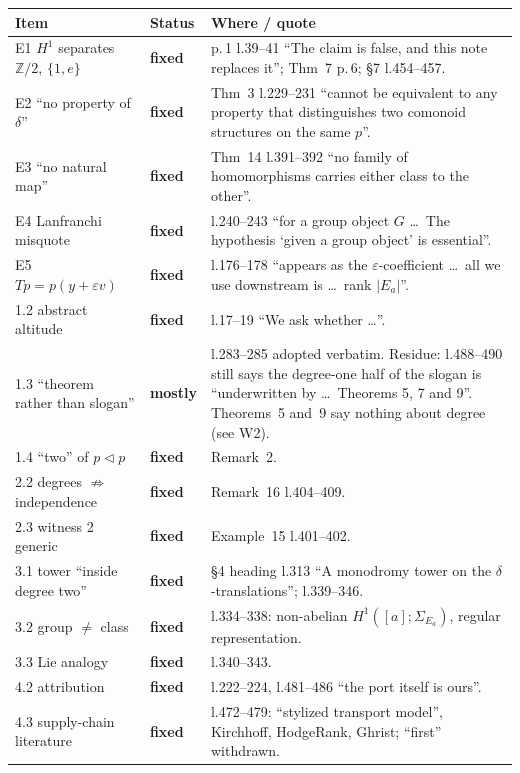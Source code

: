 \documentclass[11pt]{article}
\newcommand{\Z}{\mathbb{Z}}
\begin{document}
\begin{longtable}{p{2.6cm}p{1.9cm}p{10.6cm}}
\toprule
Item & Status & Where / quote\\\midrule\endhead
E1 $H^1$ separates $\Z/2$, $\{1,e\}$ & \textbf{fixed} & p.\,1 l.39--41 ``The claim is false, and this note replaces it''; Thm~7 p.\,6; \S7 l.454--457.\\
E2 ``no property of $\delta$'' & \textbf{fixed} & Thm~3 l.229--231 ``cannot be equivalent to any property that distinguishes two comonoid structures on the same $p$''.\\
E3 ``no natural map'' & \textbf{fixed} & Thm~14 l.391--392 ``no family of homomorphisms carries either class to the other''.\\
E4 Lanfranchi misquote & \textbf{fixed} & l.240--243 ``for a group object $G$ \dots\ The hypothesis `given a group object' is essential''.\\
E5 $Tp=p(y+\varepsilon v)$ & \textbf{fixed} & l.176--178 ``appears as the $\varepsilon$-coefficient \dots\ all we use downstream is \dots\ rank $|E_a|$''.\\
1.2 abstract altitude & \textbf{fixed} & l.17--19 ``We ask whether \dots''.\\
1.3 ``theorem rather than slogan'' & \textbf{mostly} & l.283--285 adopted verbatim. Residue: l.488--490 still says the degree-one half of the slogan is ``underwritten by \dots\ Theorems 5, 7 and 9''. Theorems~5 and~9 say nothing about degree (see W2).\\
1.4 ``two'' of $p\triangleleft p$ & \textbf{fixed} & Remark~2.\\
2.2 degrees $\not\Rightarrow$ independence & \textbf{fixed} & Remark~16 l.404--409.\\
2.3 witness 2 generic & \textbf{fixed} & Example~15 l.401--402.\\
3.1 tower ``inside degree two'' & \textbf{fixed} & \S4 heading l.313 ``A monodromy tower on the $\delta$-translations''; l.339--346.\\
3.2 group $\neq$ class & \textbf{fixed} & l.334--338: non-abelian $H^1([a];\Sigma_{E_a})$, regular representation.\\
3.3 Lie analogy & \textbf{fixed} & l.340--343.\\
4.2 attribution & \textbf{fixed} & l.222--224, l.481--486 ``the port itself is ours''.\\
4.3 supply-chain literature & \textbf{fixed} & l.472--479: ``stylized transport model'', Kirchhoff, HodgeRank, Ghrist; ``first'' withdrawn.\\

\end{longtable}
\end{document}
